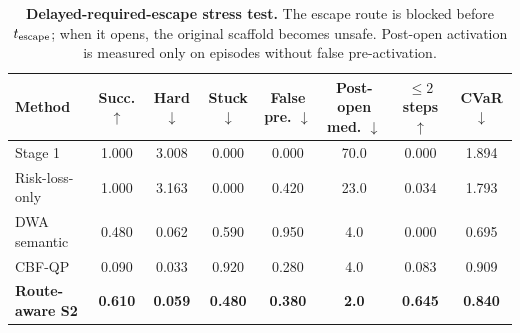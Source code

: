 \begin{table}[t]
\centering
\small
\caption{\textbf{Delayed-required-escape stress test.} The escape route is blocked before $t_{\rm escape}$; when it opens, the original scaffold becomes unsafe. Post-open activation is measured only on episodes without false pre-activation.}
\label{tab:rellis_dyn_required_escape}
\begin{tabular}{lccccccc}
\toprule
Method & Succ. $\uparrow$ & Hard $\downarrow$ & Stuck $\downarrow$ & False pre. $\downarrow$ & Post-open med. $\downarrow$ & $\leq 2$ steps $\uparrow$ & CVaR $\downarrow$ \\
\midrule
Stage 1 & 1.000 & 3.008 & 0.000 & 0.000 & 70.0 & 0.000 & 1.894 \\
Risk-loss-only & 1.000 & 3.163 & 0.000 & 0.420 & 23.0 & 0.034 & 1.793 \\
DWA semantic & 0.480 & 0.062 & 0.590 & 0.950 & 4.0 & 0.000 & 0.695 \\
CBF-QP & 0.090 & 0.033 & 0.920 & 0.280 & 4.0 & 0.083 & 0.909 \\
\textbf{Route-aware S2} & \textbf{0.610} & \textbf{0.059} & \textbf{0.480} & \textbf{0.380} & \textbf{2.0} & \textbf{0.645} & \textbf{0.840} \\
\bottomrule
\end{tabular}
\end{table}
